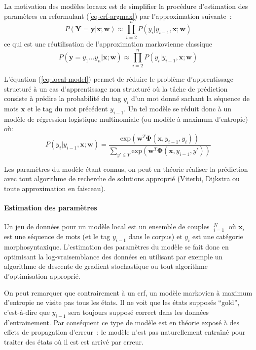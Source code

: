 \documentclass[11pt,openany]{book}
\begin{document}
La motivation des modèles locaux est de simplifier la procédure d'estimation  des paramètres 
en reformulant (\ref{eq-crf-argmax}) par l'approximation suivante~:
\begin{equation}
\label{eq-local-model}
P(\mathbf{Y}=\mathbf{y} | \mathbf{x} ; \mathbf{w}) \approx \prod_{i=2}^n P(y_i | y_{i-1}, \mathbf{x} ; \mathbf{w})
\end{equation}
ce qui est une réutilisation de l'approximation markovienne classique 
\begin{displaymath}
P(\mathbf{y} = y_1\ldots y_n | \mathbf{x};\mathbf{w}) \approx \prod_{i=2}^n P(y_i|y_{i-1},\mathbf{x};\mathbf{w})
\end{displaymath}

L'équation (\ref{eq-local-model}) permet de réduire le problème d'apprentissage structuré à un cas d'apprentissage 
non structuré où la tâche de prédiction consiste à prédire la probabilité du tag $y_i$ d'un mot donné sachant la séquence de mots 
$\mathbf{x}$ et le tag du mot précédent $y_{i-1}$.  
Un tel modèle se réduit donc à un modèle de régression logistique
multinomiale (ou modèle à maximum d'entropie) où:
\begin{displaymath}
P(y_i|y_{i-1},\mathbf{x};\mathbf{w}) = \frac{\text{exp}(  \mathbf{w}^T
  \boldsymbol\Phi(\mathbf{x}, y_{i-1}, y_i ))  }{ \sum_{y'\in Y }  \text{exp}(\mathbf{w}^T
  \boldsymbol\Phi(\mathbf{x}, y_{i-1}, y')) } 
\end{displaymath}

Les paramètres du modèle étant connus, on peut en théorie réaliser la prédiction avec tout algorithme de recherche de solutions approprié
(Viterbi, Dijkstra ou toute approximation en faisceau).

\paragraph{Estimation des paramètres}
Un jeu de données pour un modèle local est un ensemble de couples $\mathop{(\mathbf{x}_i y_{i-1}, y_i)}_{i=1}^N$
où $\mathbf{x}_i$ est une séquence de mots (et le tag $y_{i-1}$ dans le corpus)  et $y_i$ est une catégorie morphosyntaxique.
L'estimation des paramètres du modèle se fait donc en optimisant la log-vraisemblance des données en utilisant par exemple un algorithme de descente
de gradient stochastique ou tout algorithme d'optimisation approprié.


On peut remarquer que contrairement à un {\sc crf}, un modèle markovien à maximum d'entropie ne visite pas tous les états.
Il ne voit que les états supposés ``gold'', c'est-à-dire que $y_{i-1}$ sera toujours supposé correct dans les données d'entrainement.
Par conséquent ce type de modèle est en théorie exposé à des effets de propagation d'erreur~: le modèle n'est pas naturellement entraîné pour traiter des 
états où il est est arrivé par erreur.
\end{document}

